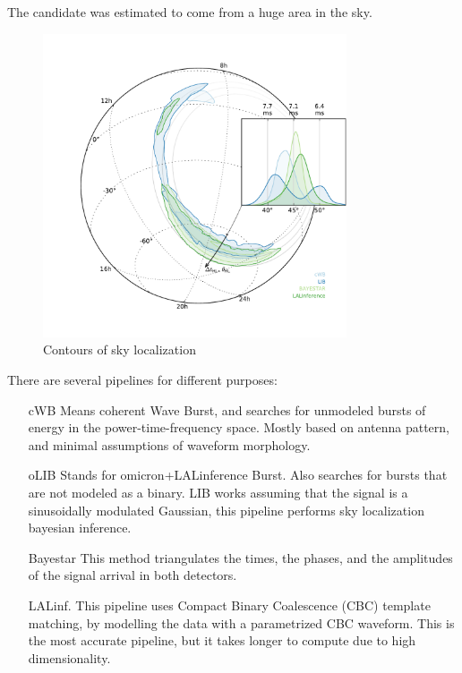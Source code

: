 \documentclass[10pt]{beamer}
\begin{document}
\begin{frame}
The candidate was estimated to come from a huge area in the sky.
\begin{figure}
 \centering
 \includegraphics[width=0.8\textwidth]{./slides/plots/160208492v4/contours.pdf}
 
 \caption{Contours of sky localization}
 \label{fig:contours}
\end{figure}
\end{frame}
\begin{frame}
There are several pipelines for different purposes:

\begin{itemize}[<+->]
 \item[cWB] Means coherent Wave Burst, and searches for unmodeled bursts
 of energy in the power-time-frequency space. Mostly based on antenna pattern, 
 and minimal assumptions of waveform morphology.
 
 \item[oLIB] Stands for omicron+LALinference Burst. Also searches for 
 bursts that are not modeled as a binary. LIB works assuming that the 
 signal is a sinusoidally modulated Gaussian, this pipeline performs 
 sky localization bayesian inference.
 
 \item[Bayestar] This method triangulates the times, the phases, and the 
 amplitudes of the signal arrival in both detectors.
 
 \item[LALinf.] This pipeline uses Compact Binary Coalescence (CBC) 
 template matching, by modelling the data with a parametrized CBC waveform.
 This is the most accurate pipeline, but it takes longer to compute
 due to high dimensionality.
\end{itemize}

\end{frame}
\end{document}
